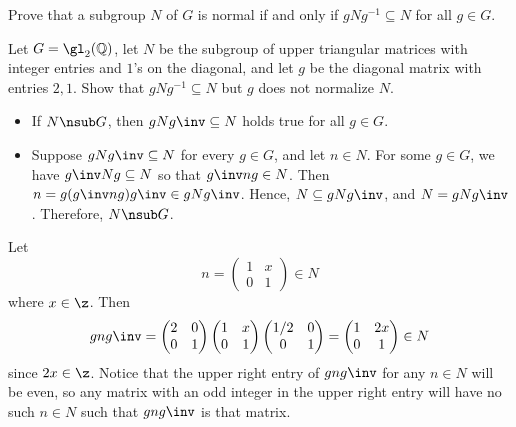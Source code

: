 \begin{exercise}\label{ex3.1.25}
    \begin{subproblems}
        \item Prove that a subgroup $N$ of $G$ is normal if and only if $gNg^{-1} \subseteq N$ for all $g \in G$.
        \item Let $G = \gl_2(\mathbb{Q})$, let $N$ be the subgroup of upper triangular matrices with integer entries and $1$'s on the diagonal, and let $g$ be the diagonal matrix with entries $2,1$. Show that $gNg^{-1} \subseteq N$ but $g$ does not normalize $N$.
    \end{subproblems}
\end{exercise}

\begin{solalph}
    \item
    \begin{itemize}
        \item[\rightimp] If $N \nsub G$, then $gNg\inv \subseteq N$ holds true for all $g \in G$.
        \item[\leftimp] Suppose $gNg\inv \subseteq N$ for every $g \in G$, and let $n \in N$. For some $g \in G$, we have $g\inv Ng \subseteq N$ so that $g\inv ng \in N$. Then $n = g(g\inv ng)g\inv \in gNg\inv$. Hence, $N \subseteq gNg\inv$, and $N = gNg\inv$. Therefore, $N \nsub G$.
    \end{itemize}
    \item Let
    \[n = 
    \begin{pmatrix}
        1 & x \\
        0 & 1
    \end{pmatrix} \in N\]
    where $x \in \z$. Then
    \[gng\inv = 
    \begin{pmatrix}
        2 & 0 \\
        0 & 1
    \end{pmatrix}
    \begin{pmatrix}
        1 & x \\
        0 & 1
    \end{pmatrix}
    \begin{pmatrix}
        1/2 & 0 \\
        0 & 1
    \end{pmatrix} = 
    \begin{pmatrix}
        1 & 2x \\
        0 & 1
    \end{pmatrix} \in N\]
    since $2x \in \z$. Notice that the upper right entry of $gng\inv$ for any $n \in N$ will be even, so any matrix with an odd integer in the upper right entry will have no such $n \in N$ such that $gng\inv$ is that matrix.
\end{solalph}

